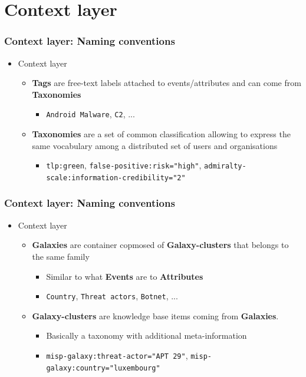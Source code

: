 \section{Context layer}
\begin{frame}
    \frametitle{Context layer: Naming conventions}
     \begin{itemize}
            \item Context layer
            \begin{itemize}
                \item {\bf Tags} are free-text labels attached to events/attributes and can come from {\bf Taxonomies}
                \begin{itemize}
                    \item \texttt{Android Malware}, \texttt{C2}, ...
                \end{itemize}

                \item {\bf Taxonomies} are a set of common classification allowing to express the same vocabulary among a distributed set of users and organisations 
                \begin{itemize}
                    \item \texttt{tlp:green}, \texttt{false-positive:risk="high"}, \texttt{admiralty-scale:information-credibility="2"}
                \end{itemize}
            \end{itemize}
    \end{itemize}
\end{frame}

\begin{frame}
    \frametitle{Context layer: Naming conventions}
     \begin{itemize}
            \item Context layer
            \begin{itemize}
                \item {\bf Galaxies} are container copmosed of {\bf Galaxy-clusters} that belongs to the same family
                \begin{itemize}
                    \item Similar to what {\bf Events} are to {\bf Attributes}
                    \item \texttt{Country}, \texttt{Threat actors}, \texttt{Botnet}, ...
                \end{itemize}

                \item {\bf Galaxy-clusters} are knowledge base items coming from {\bf Galaxies}.
                \begin{itemize}
                    \item Basically a taxonomy with additional meta-information
                    \item \texttt{misp-galaxy:threat-actor="APT 29"}, \texttt{misp-galaxy:country="luxembourg"}
                \end{itemize}
            \end{itemize}
    \end{itemize}
\end{frame}

